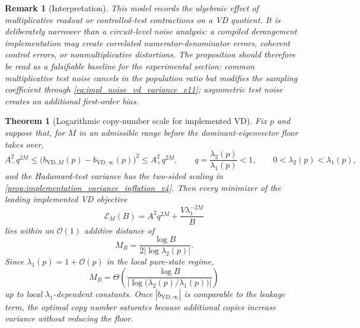 \documentclass[11pt]{article}
\newtheorem{theorem}{Theorem}
\newtheorem{remark}{Remark}
\newcommand{\1}{\mathbf{1}}
\newcommand{\OO}{\mathcal{O}}
\newcommand{\abs}[1]{\left\lvert #1 \right\rvert}
\begin{document}
\begin{remark}[Interpretation]
\label{rem:impl_noise_interpretation_v11}
This model records the algebraic effect of multiplicative readout or controlled-test contractions on a VD quotient.  It is deliberately narrower than a circuit-level noise analysis: a compiled derangement implementation may create correlated numerator-denominator errors, coherent control errors, or nonmultiplicative distortions.  The proposition should therefore be read as a falsifiable baseline for the experimental section: common multiplicative test noise cancels in the population ratio but modifies the sampling coefficient through \cref{eq:impl_noise_vd_variance_v11}; asymmetric test noise creates an additional first-order bias.
\end{remark}


\begin{theorem}[Logarithmic copy-number scale for implemented VD]
\label{thm:mstar_log_scale_v4}
Fix \(p\) and suppose that, for \(M\) in an admissible range before the dominant-eigenvector floor takes over,
\begin{equation}
    A_-^2q^{2M}
    \leq
    \bigl(b_{\mathrm{VD},M}(p)-b_{\mathrm{VD},\infty}(p)\bigr)^2
    \leq
    A_+^2q^{2M},
    \qquad
    q=\frac{\lambda_2(p)}{\lambda_1(p)}<1, \qquad 0<\lambda_2(p)<\lambda_1(p),
    \label{eq:bias_two_sided_mstar_v4}
\end{equation}
and the Hadamard-test variance has the two-sided scaling in \cref{prop:implementation_variance_inflation_v4}.  Then every minimizer of the leading implemented VD objective
\begin{equation}
    \mathcal E_M(B)=A^2q^{2M}+\frac{V\lambda_1^{-2M}}{B}
\end{equation}
lies within an \(\OO(1)\) additive distance of
\begin{equation}
    M_B=\frac{\log B}{2\abs{\log\lambda_2(p)}}.
    \label{eq:mstar_log_lambda2_v4}
\end{equation}
Since \(\lambda_1(p)=1+\OO(p)\) in the local pure-state regime,
\begin{equation}
    M_B=\Theta\!\left(\frac{\log B}{\abs{\log\!\bigl(\lambda_2(p)/\lambda_1(p)\bigr)}}\right)
\end{equation}
up to local \(\lambda_1\)-dependent constants.  Once \(\abs{b_{\mathrm{VD},\infty}}\) is comparable to the leakage term, the optimal copy number saturates because additional copies increase variance without reducing the floor.
\end{theorem}
\end{document}
